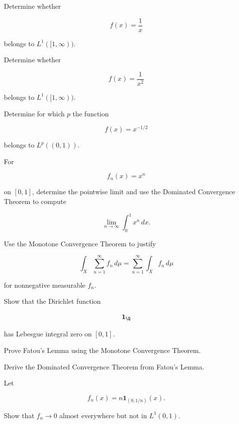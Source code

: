 \begin{exercise}[2]
Determine whether

\[
f(x)=\frac1x
\]

belongs to \(L^1([1,\infty))\).
\end{exercise}

\begin{exercise}[2]
Determine whether

\[
f(x)=\frac1{x^2}
\]

belongs to \(L^1([1,\infty))\).
\end{exercise}

\begin{exercise}[2]
Determine for which \(p\) the function

\[
f(x)=x^{-1/2}
\]

belongs to \(L^p((0,1))\).
\end{exercise}

\begin{exercise}[2]
For

\[
f_n(x)=x^n
\]

on \([0,1]\), determine the pointwise limit and use the Dominated
Convergence Theorem to compute

\[
\lim_{n\to\infty}
\int_0^1x^n\,dx.
\]
\end{exercise}

\begin{exercise}[2]
Use the Monotone Convergence Theorem to justify

\[
\int_X
\sum_{n=1}^{\infty}f_n\,d\mu
=
\sum_{n=1}^{\infty}
\int_Xf_n\,d\mu
\]

for nonnegative measurable \(f_n\).
\end{exercise}

\begin{exercise}[2]
Show that the Dirichlet function

\[
\mathbf{1}_{\Q}
\]

has Lebesgue integral zero on \([0,1]\).
\end{exercise}

\begin{exercise}[3]
Prove Fatou's Lemma using the Monotone Convergence Theorem.
\end{exercise}

\begin{exercise}[3]
Derive the Dominated Convergence Theorem from Fatou's Lemma.
\end{exercise}

\begin{exercise}[3]
Let

\[
f_n(x)
=
n\mathbf{1}_{(0,1/n)}(x).
\]

Show that \(f_n\to0\) almost everywhere but not in \(L^1(0,1)\).
\end{exercise}

